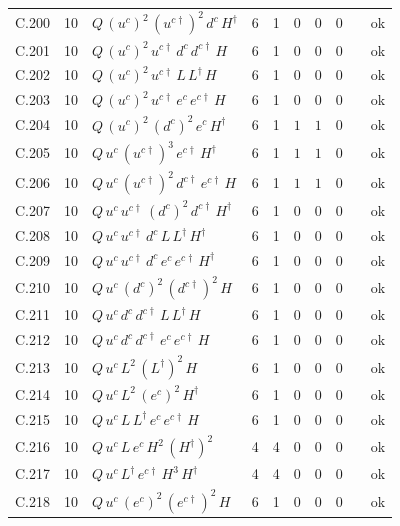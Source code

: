 {\begin{longtable}{@{}ll>{\raggedright\arraybackslash}p{6.4cm}rrllllr@{}}
C.200 & 10 & $Q\,(u^c)^{2}\,(u^{c\dagger})^{2}\,d^c\,H^\dagger$ & 6 & 1 & $0$ & $0$ & $0$ &  & ok \\
C.201 & 10 & $Q\,(u^c)^{2}\,u^{c\dagger}\,d^c\,d^{c\dagger}\,H$ & 6 & 1 & $0$ & $0$ & $0$ &  & ok \\
C.202 & 10 & $Q\,(u^c)^{2}\,u^{c\dagger}\,L\,L^\dagger\,H$ & 6 & 1 & $0$ & $0$ & $0$ &  & ok \\
C.203 & 10 & $Q\,(u^c)^{2}\,u^{c\dagger}\,e^c\,e^{c\dagger}\,H$ & 6 & 1 & $0$ & $0$ & $0$ &  & ok \\
C.204 & 10 & $Q\,(u^c)^{2}\,(d^c)^{2}\,e^c\,H^\dagger$ & 6 & 1 & $1$ & $1$ & $0$ &  & ok \\
C.205 & 10 & $Q\,u^c\,(u^{c\dagger})^{3}\,e^{c\dagger}\,H^\dagger$ & 6 & 1 & $1$ & $1$ & $0$ &  & ok \\
C.206 & 10 & $Q\,u^c\,(u^{c\dagger})^{2}\,d^{c\dagger}\,e^{c\dagger}\,H$ & 6 & 1 & $1$ & $1$ & $0$ &  & ok \\
C.207 & 10 & $Q\,u^c\,u^{c\dagger}\,(d^c)^{2}\,d^{c\dagger}\,H^\dagger$ & 6 & 1 & $0$ & $0$ & $0$ &  & ok \\
C.208 & 10 & $Q\,u^c\,u^{c\dagger}\,d^c\,L\,L^\dagger\,H^\dagger$ & 6 & 1 & $0$ & $0$ & $0$ &  & ok \\
C.209 & 10 & $Q\,u^c\,u^{c\dagger}\,d^c\,e^c\,e^{c\dagger}\,H^\dagger$ & 6 & 1 & $0$ & $0$ & $0$ &  & ok \\
C.210 & 10 & $Q\,u^c\,(d^c)^{2}\,(d^{c\dagger})^{2}\,H$ & 6 & 1 & $0$ & $0$ & $0$ &  & ok \\
C.211 & 10 & $Q\,u^c\,d^c\,d^{c\dagger}\,L\,L^\dagger\,H$ & 6 & 1 & $0$ & $0$ & $0$ &  & ok \\
C.212 & 10 & $Q\,u^c\,d^c\,d^{c\dagger}\,e^c\,e^{c\dagger}\,H$ & 6 & 1 & $0$ & $0$ & $0$ &  & ok \\
C.213 & 10 & $Q\,u^c\,L^{2}\,(L^\dagger)^{2}\,H$ & 6 & 1 & $0$ & $0$ & $0$ &  & ok \\
C.214 & 10 & $Q\,u^c\,L^{2}\,(e^c)^{2}\,H^\dagger$ & 6 & 1 & $0$ & $0$ & $0$ &  & ok \\
C.215 & 10 & $Q\,u^c\,L\,L^\dagger\,e^c\,e^{c\dagger}\,H$ & 6 & 1 & $0$ & $0$ & $0$ &  & ok \\
C.216 & 10 & $Q\,u^c\,L\,e^c\,H^{2}\,(H^\dagger)^{2}$ & 4 & 4 & $0$ & $0$ & $0$ &  & ok \\
C.217 & 10 & $Q\,u^c\,L^\dagger\,e^{c\dagger}\,H^{3}\,H^\dagger$ & 4 & 4 & $0$ & $0$ & $0$ &  & ok \\
C.218 & 10 & $Q\,u^c\,(e^c)^{2}\,(e^{c\dagger})^{2}\,H$ & 6 & 1 & $0$ & $0$ & $0$ &  & ok \\

\end{longtable}}
